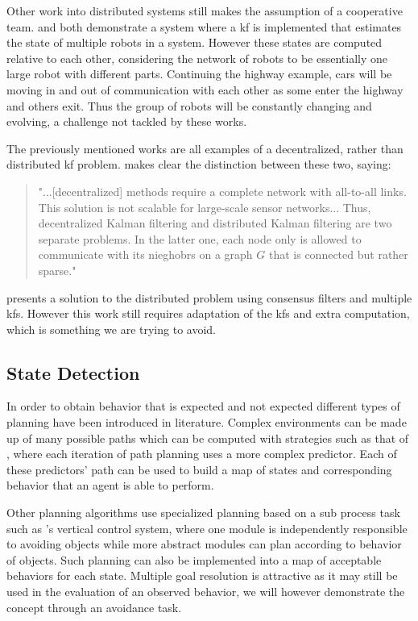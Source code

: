 \documentclass[conference]{IEEEtran}
\begin{document}
Other work into distributed systems still makes the assumption of a cooperative team. \cite{Sanderson1997} and \cite{Roumeliotis2002} both demonstrate a system where a \gls{kf} is implemented that estimates the state of multiple robots in a system. However these states are computed relative to each other, considering the network of robots to be essentially one large robot with different parts. Continuing the highway example, cars will be moving in and out of communication with each other as some enter the highway and others exit. Thus the group of robots will be constantly changing and evolving, a challenge not tackled by these works.

The previously mentioned works are all examples of a decentralized, rather than distributed \gls{kf} problem. \cite{Olfati-Saber2005} makes clear the distinction between these two, saying:
\begin{quote}"...[decentralized] methods require a complete network with all-to-all links. This solution is not scalable for large-scale sensor networks... Thus, decentralized Kalman filtering and distributed Kalman filtering are two separate problems. In the latter one, each node only is allowed to communicate with its nieghobrs on a graph $G$ that is connected but rather sparse."
\end{quote}
\cite{Olfati-Saber2005} presents a solution to the distributed problem using consensus filters and multiple \glspl{kf}. However this work still requires adaptation of the \glspl{kf} and extra computation, which is something we are trying to avoid.

\subsection{State Detection}

In order to obtain behavior that is expected and not expected different types of planning have been introduced in literature. Complex environments can be made up of many possible paths which can be computed with strategies such as that of \cite{tallavajhula2016list}, where each iteration of path planning uses a more complex predictor. Each of these predictors' path can be used to build a map of states and corresponding behavior that an agent is able to perform. 

Other planning algorithms use specialized planning based on a sub process task such as \cite{ahn2008robust}'s vertical control system, where one module is independently responsible to avoiding objects while more abstract modules can plan according to behavior of objects. Such planning can also be implemented into a map of acceptable behaviors for each state. Multiple goal resolution is attractive as it may still be used in the evaluation of an observed behavior, we will however demonstrate the concept through an avoidance task.
\end{document}
